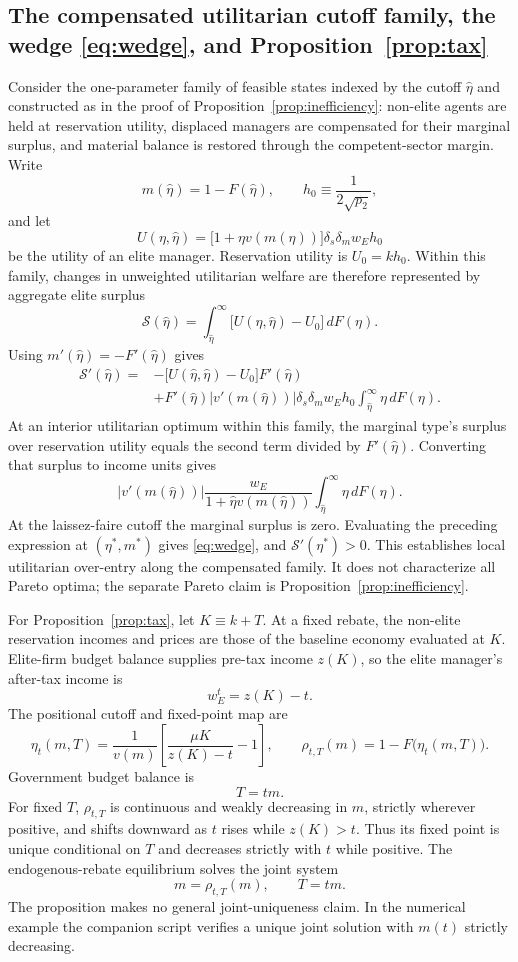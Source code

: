 \documentclass[12pt,letterpaper]{article}
\theoremstyle{definition}
\begin{document}
\subsection[The compensated utilitarian cutoff family and membership tax]{The compensated utilitarian cutoff family, the wedge \eqref{eq:wedge}, and Proposition~\ref{prop:tax}}

Consider the one-parameter family of feasible states indexed by the cutoff $\hat\eta$ and constructed as in the proof of Proposition~\ref{prop:inefficiency}: non-elite agents are held at reservation utility, displaced managers are compensated for their marginal surplus, and material balance is restored through the competent-sector margin.
Write
\[
  m(\hat\eta)=1-F(\hat\eta),
  \qquad
  h_0\equiv\frac{1}{2\sqrt{p_2}},
\]
and let
\[
  U(\eta,\hat\eta)
  =
  \big[1+\eta v(m(\hat\eta))\big]
  \delta_s\delta_m w_E h_0
\]
be the utility of an elite manager.
Reservation utility is $U_0=kh_0$.
Within this family, changes in unweighted utilitarian welfare are therefore represented by aggregate elite surplus
\[
  \mathcal S(\hat\eta)
  =
  \int_{\hat\eta}^{\infty}
  \big[U(\eta,\hat\eta)-U_0\big]\,dF(\eta).
\]
Using $m'(\hat\eta)=-F'(\hat\eta)$ gives
\[
\begin{split}
  \mathcal S'(\hat\eta)
  ={}&
  -\big[U(\hat\eta,\hat\eta)-U_0\big]F'(\hat\eta)\\
  &+
  F'(\hat\eta)\left|v'(m(\hat\eta))\right|
  \delta_s\delta_m w_Eh_0
  \int_{\hat\eta}^{\infty}\eta\,dF(\eta).
\end{split}
\]
At an interior utilitarian optimum within this family, the marginal type's surplus over reservation utility equals the second term divided by $F'(\hat\eta)$.
Converting that surplus to income units gives
\[
  \left|v'(m(\hat\eta))\right|
  \frac{w_E}{1+\hat\eta v(m(\hat\eta))}
  \int_{\hat\eta}^{\infty}\eta\,dF(\eta).
\]
At the laissez-faire cutoff the marginal surplus is zero.
Evaluating the preceding expression at $(\eta^\ast,m^\ast)$ gives \eqref{eq:wedge}, and $\mathcal S'(\eta^\ast)>0$.
This establishes local utilitarian over-entry along the compensated family.
It does not characterize all Pareto optima; the separate Pareto claim is Proposition~\ref{prop:inefficiency}.

For Proposition~\ref{prop:tax}, let $K\equiv k+T$.
At a fixed rebate, the non-elite reservation incomes and prices are those of the baseline economy evaluated at $K$.
Elite-firm budget balance supplies pre-tax income $z(K)$, so the elite manager's after-tax income is
\[
  w_E^t=z(K)-t.
\]
The positional cutoff and fixed-point map are
\[
  \eta_t(m,T)
  =
  \frac{1}{v(m)}
  \left[
    \frac{\mu K}{z(K)-t}-1
  \right],
  \qquad
  \rho_{t,T}(m)
  =
  1-F\big(\eta_t(m,T)\big).
\]
Government budget balance is
\[
  T=tm.
\]
For fixed $T$, $\rho_{t,T}$ is continuous and weakly decreasing in $m$, strictly wherever positive, and shifts downward as $t$ rises while $z(K)>t$.
Thus its fixed point is unique conditional on $T$ and decreases strictly with $t$ while positive.
The endogenous-rebate equilibrium solves the joint system
\[
  m=\rho_{t,T}(m),
  \qquad
  T=tm.
\]
The proposition makes no general joint-uniqueness claim.
In the numerical example the companion script verifies a unique joint solution with $m(t)$ strictly decreasing.
\end{document}
